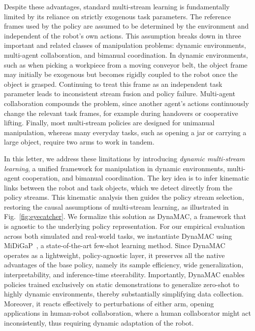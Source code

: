 \documentclass[letterpaper, 10 pt, journal, twoside]{IEEEtran}
\renewcommand{\figref}[1]{Fig.~\ref{#1}}
\newcommand{\ourmethod}{DynaMAC\xspace}
\begin{document}
%
%
%
%
%
%
%
%
%
%
%
%
%
%
%
%
%
%
%
%
%
%
%
%
Despite these advantages, standard multi-stream learning is fundamentally limited by its reliance on strictly exogenous task parameters.
The reference frames used by the policy are assumed to be determined by the environment and independent of the robot’s own actions.
This assumption breaks down in three important and related classes of manipulation problems: dynamic environments, multi-agent collaboration, and bimanual coordination.
In dynamic environments, such as when picking a workpiece from a moving conveyor belt, the object frame may initially be exogenous but becomes rigidly coupled to the robot once the object is grasped. Continuing to treat this frame as an independent task parameter leads to inconsistent stream fusion and policy failure.
Multi-agent collaboration compounds the problem, since another agent’s actions continuously change the relevant task frames, for example during handovers or cooperative lifting.
%
Finally, most multi-stream policies are designed for unimanual manipulation, whereas many everyday tasks, such as opening a jar or carrying a large object, require two arms to work in tandem.

%
In this letter, we address these limitations by introducing \emph{dynamic multi-stream learning}, a unified framework for manipulation in dynamic environments, multi-agent cooperation, and bimanual coordination.
The key idea is to infer kinematic links between the robot and task objects, which we detect directly from the policy streams.
%
%
%
This kinematic analysis then guides the policy stream selection, restoring the causal assumptions of multi-stream learning, as illustrated in \figref{fig:eyecatcher}.
%
%
%
%
%
%
%
We formalize this solution as \ourmethod{}, a framework that is agnostic to the underlying policy representation. 
For our empirical evaluation across both simulated and real-world tasks, we instantiate \ourmethod{} using MiDiGaP~\cite{von2025unreasonable}, a state-of-the-art few-shot learning method. 
Since DynaMAC operates as a lightweight, policy-agnostic layer, it preserves all the native advantages of the base policy, namely its sample efficiency, wide generalization, interpretability, and inference-time steerability.
%
%
%
Importantly, \ourmethod{} enables policies trained exclusively on static demonstrations to generalize zero-shot to highly dynamic environments, thereby substantially simplifying data collection.
Moreover, it reacts effectively to perturbations of either arm, opening applications in human-robot collaboration, where a human collaborator might act inconsistently, thus requiring dynamic adaptation of the robot.
\end{document}
